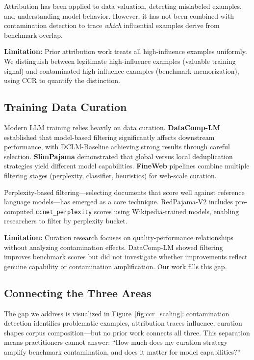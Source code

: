 Attribution has been applied to data valuation, detecting mislabeled examples, and understanding model behavior. However, it has not been combined with contamination detection to trace \textit{which} influential examples derive from benchmark overlap.

\textbf{Limitation:} Prior attribution work treats all high-influence examples uniformly. We distinguish between legitimate high-influence examples (valuable training signal) and contaminated high-influence examples (benchmark memorization), using CCR to quantify the distinction.

\subsection{Training Data Curation}

Modern LLM training relies heavily on data curation. \textbf{DataComp-LM} \citep{li2024datacomp} established that model-based filtering significantly affects downstream performance, with DCLM-Baseline achieving strong results through careful selection. \textbf{SlimPajama} \citep{shen2023slimpajama} demonstrated that global versus local deduplication strategies yield different model capabilities. \textbf{FineWeb} pipelines \citep{penedo2025fineweb} combine multiple filtering stages (perplexity, classifier, heuristics) for web-scale curation.

Perplexity-based filtering---selecting documents that score well against reference language models---has emerged as a core technique. RedPajama-V2 includes pre-computed \texttt{ccnet\_perplexity} scores using Wikipedia-trained models, enabling researchers to filter by perplexity bucket.

\textbf{Limitation:} Curation research focuses on quality-performance relationships without analyzing contamination effects. DataComp-LM showed filtering improves benchmark scores but did not investigate whether improvements reflect genuine capability or contamination amplification. Our work fills this gap.

\subsection{Connecting the Three Areas}

The gap we address is visualized in Figure~\ref{fig:ccr_scaling}: contamination detection identifies problematic examples, attribution traces influence, curation shapes corpus composition---but no prior work connects all three. This separation means practitioners cannot answer: ``How much does my curation strategy amplify benchmark contamination, and does it matter for model capabilities?''

